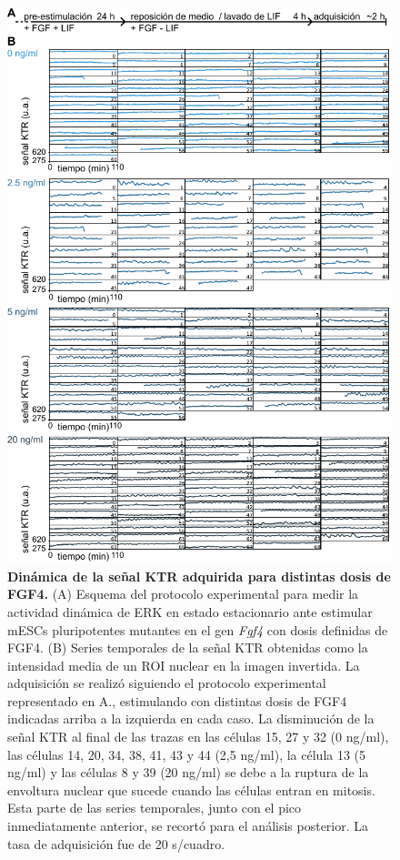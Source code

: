 \documentclass[./main.tex]{subfiles}
\begin{document}
\begin{figure}
    \centering
    \includegraphics[width=1\columnwidth]{figures/chapter3/C3_FGF_traces.pdf} 
    \caption{ \textbf{Dinámica de la señal KTR adquirida para distintas dosis de FGF4.} (A) Esquema del protocolo experimental para medir la actividad dinámica de ERK en estado estacionario ante estimular mESCs pluripotentes mutantes en el gen \textit{Fgf4} con dosis definidas de FGF4. (B) Series temporales de la señal KTR obtenidas como la intensidad media de un ROI nuclear en la imagen invertida. La adquisición se realizó siguiendo el protocolo experimental representado en A., estimulando con distintas dosis de FGF4 indicadas arriba a la izquierda en cada caso. La disminución de la señal KTR al final de las trazas en las células 15, 27 y 32 (0 ng/ml), las células 14, 20, 34, 38, 41, 43 y 44 (2,5 ng/ml), la célula 13 (5 ng/ml) y las células 8 y 39 (20 ng/ml) se debe a la ruptura de la envoltura nuclear que sucede cuando las células entran en mitosis. Esta parte de las series temporales, junto con el pico inmediatamente anterior, se recortó para el análisis posterior. La tasa de adquisición fue de 20 s/cuadro.}
    \label{C3_fig:FGF_traces}
\end{figure}
\end{document}
